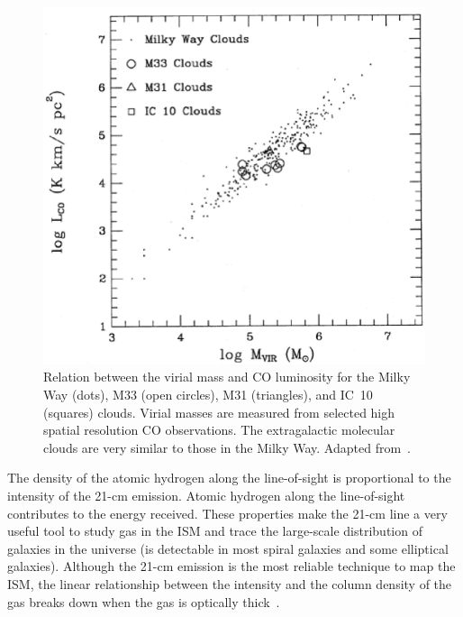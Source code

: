 \begin{figure}
\label{fig: mco}
\centering
\includegraphics[width=16cm]{../image_intro/mvirial_lco.eps}
\caption{Relation between the virial mass and CO luminosity for the Milky Way (dots), M33 (open circles), M31 (triangles), and IC~10 (squares) clouds. Virial masses are measured from selected high spatial resolution CO observations. The extragalactic molecular clouds are very similar to those in the Milky Way. Adapted from~\cite{Young91}.}
\end{figure}
 
The density of the atomic hydrogen along the line-of-sight is proportional to the intensity of the 21-cm emission. %
Atomic hydrogen along the line-of-sight contributes to the energy received. %
These properties make the 21-cm line a very useful tool to study gas in the ISM and trace the large-scale distribution of galaxies in the universe (\hi is detectable in most spiral galaxies and some elliptical galaxies).
Although the 21-cm emission is the most reliable technique to map the ISM, the linear relationship between the intensity and the column density of the gas breaks down when the gas is optically thick~\citep{Braun09}. %

